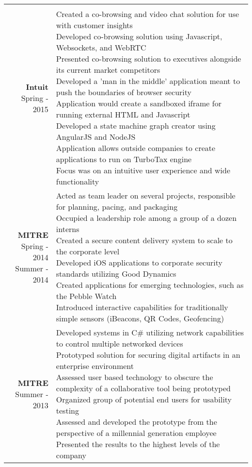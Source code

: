 \documentclass{article}
\makeatletter
\newcommand*\lineBr[2][c]{\begin{tabular}[#1]{@{}r@{}}#2\end{tabular}}
\newcommand*\lineBl[2][c]{\begin{tabular}[#1]{@{}l@{}}#2\end{tabular}}
\makeatother
\begin{document}
\begin{tabularx}{\textwidth}{ r | X }
{  } \\
  \vspace{4mm}
  \lineBr{ {\large {\bf Intuit }\\[2mm]Spring - 2015}} &
  \lineBl{
    Created a co-browsing and video chat solution for use with customer insights \\[2mm]
    Developed co-browsing solution using Javascript, Websockets, and WebRTC \\[2mm]
    Presented co-browsing solution to executives alongside its current market competitors \\[2mm]
    Developed a 'man in the middle' application meant to push the boundaries of browser security \\[2mm]
    Application would create a sandboxed iframe for running external HTML and Javascript \\[2mm]
    Developed a state machine graph creator using AngularJS and NodeJS \\[2mm]
    Application allows outside companies to create applications to run on TurboTax engine \\[2mm]
    Focus was on an intuitive user experience and wide functionality 
  } \\
  \vspace{4mm}
  \lineBr{ {\large {\bf MITRE }\\[2mm]Spring - 2014\\Summer - 2014}} &
  \lineBl{
    Acted as team leader on several projects, responsible for planning, pacing, and packaging \\[2mm]
    Occupied a leadership role among a group of a dozen interns \\[2mm]
    Created a secure content delivery system to scale to the corporate level \\[2mm]
    Developed iOS applications to corporate security standards utilizing Good Dynamics \\[2mm]
    Created applications for emerging technologies, such as the Pebble Watch \\[2mm]
    Introduced interactive capabilities for traditionally simple sensors (iBeacons, QR Codes, Geofencing) \\[2mm]
  } \\
  \vspace{4mm}
  \lineBr{ {\large {\bf MITRE }\\[2mm]Summer - 2013}} &
  \lineBl{
    Developed systems in C\# utilizing network capabilities to control multiple networked devices \\[2mm]
    Prototyped solution for securing digital artifacts in an enterprise environment\\[2mm]
    Assessed user based technology to obscure the complexity of a collaborative tool being prototyped \\[2mm]
    Organized group of potential end users for usability testing \\[2mm]
    Assessed and developed the prototype from the perspective of a millennial generation employee \\[2mm]
    Presented the results to the highest levels of the company 
  }
\end{tabularx}
\end{document}
